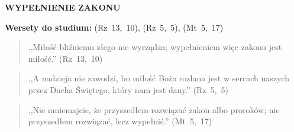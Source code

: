 \documentclass[10pt,a4paper,oneside]{article}
\begin{document}
\centerline{\textbf{\MakeUppercase{Wypełnienie zakonu}}}
\begin{center}
\textbf{Wersety do studium:} \mbox{(Rz 13, 10)}, \mbox{(Rz 5, 5)}, \mbox{(Mt 5, 17)}
\end{center}
\begin{quote}
,,Miłość bliźniemu złego nie wyrządza; wypełnieniem więc zakonu jest miłość.'' \mbox{(Rz 13, 10)}
\end{quote}
\begin{quote}
,,A nadzieja nie zawodzi, bo miłość Boża rozlana jest w sercach naszych przez Ducha Świętego, który nam jest dany.'' \mbox{(Rz 5, 5)}
\end{quote}
\begin{quote}
,,Nie mniemajcie, że przyszedłem rozwiązać zakon albo proroków; nie przyszedłem rozwiązać, lecz wypełnić.'' \mbox{(Mt 5, 17)}
\end{quote}
\end{document}
